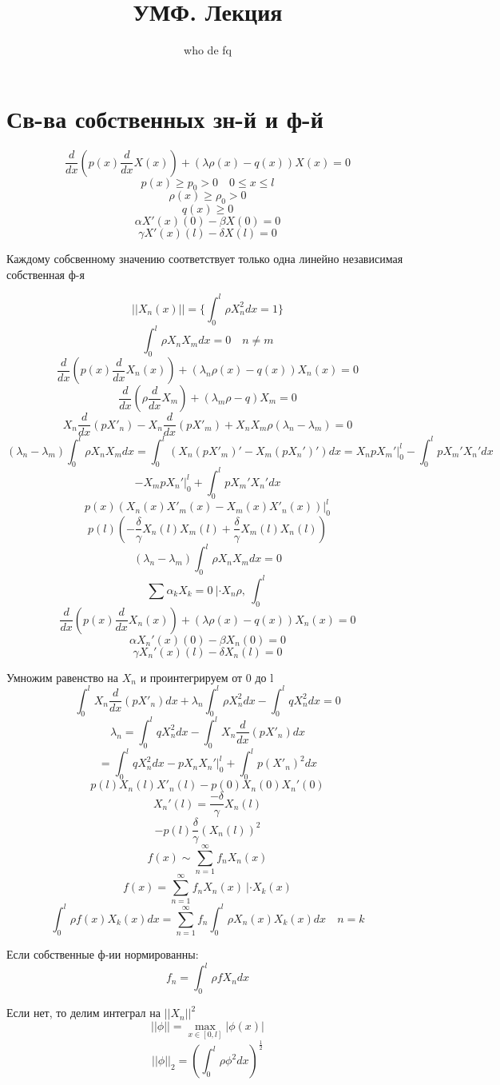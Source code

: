 \documentclass[a4paper]{article}
\begin{document}
\title{УМФ. Лекция}
\author{who de fq}
\maketitle

\section*{\centering Св-ва собственных зн-й и ф-й}
\[
    \frac{d}{dx} \left(p(x) \frac{d}{dx} X(x)\right) + (\lambda \rho(x) - q(x)) X(x) = 0
\]
\[
    p(x) \geq p_0 > 0 \quad 0 \leq x \leq l
\]
\[
    \rho(x) \geq \rho_0 > 0
\]
\[
    q(x) \geq 0
\]
\[
    \alpha X'(x)(0) - \beta X(0) = 0
\]
\[
    \gamma X'(x)(l) - \delta X(l) = 0
\]

Каждому собсвенному значению соответствует только одна линейно независимая
собственная ф-я

\[
    ||X_n(x)|| = \{ \int_{0}^{l} \rho X_n^2 dx = 1 \}
\]
\[
    \int_{0}^{l} \rho X_n X_m dx = 0 \quad n \neq m
\]
\[
    \frac{d}{dx} \left(p(x) \frac{d}{dx} X_n(x)\right) + (\lambda_n \rho(x) - q(x)) X_n(x) = 0
\]
\[
    \frac{d}{dx} \left(\rho \frac{d}{dx} X_m\right) + (\lambda_m \rho - q) X_m = 0
\]
\[
    X_n \frac{d}{dx} (pX'_n) - X_n \frac{d}{dx} (pX'_m) + X_n X_m \rho
    (\lambda_n - \lambda_m) = 0
\]
\[
    (\lambda_n - \lambda_m) \int_{0}^{l} \rho X_n X_m dx =
    \int_{0}^{l} \left( X_n(pX'_m)' - X_m(pX_n')' \right) dx
    = X_n p X_m' \big|_{0}^{l} - \int_{0}^{l} p X_m' X_n' dx 
\]
\[
    - X_m p X_n' |_{0}^{l} + \int_{0}^{l} p X_m' X_n' dx
\]
\[
    p(x) (X_n(x) X'_m(x) - X_m(x) X'_n(x)) \big|_{0}^{l}
\]
\[
    p(l) \left(-\frac{\delta}{\gamma} X_n(l) X_m(l) + \frac{\delta}{\gamma} 
    X_m(l) X_n(l) \right)
\]
\[
    (\lambda_n - \lambda_m) \int_{0}^{l} \rho X_n X_m dx = 0
\]
\[
    \sum \alpha_{k} X_k = 0 \ | \cdot X_n \rho, \ \int_{0}^{l}
\]
\[
    \frac{d}{dx} \left(p(x) \frac{d}{dx} X_n(x)\right) + (\lambda \rho(x) - q(x)) X_n(x) = 0
\]
\[
    \alpha X_n'(x)(0) - \beta X_n(0) = 0
\]
\[
    \gamma X_n'(x)(l) - \delta X_n(l) = 0
\]

Умножим равенство на $ X_n $ и проинтегрируем от 0 до l
\[
    \int_{0}^{l} X_n \frac{d}{dx} (pX'_n) dx + \lambda_n \int_{0}^{l} \rho
    X^2_n dx - \int_{0}^{l} q X^2_n dx = 0
\]
\[
    \lambda_n = \int_{0}^{l} q X_n^2 dx - \int_{0}^{l} X_n \frac{d}{dx} (pX'_n) dx
\]
\[
    = \int_{0}^{l} q X_n^2 dx - p X_n X_n' \big|_{0}^{l} + \int_{0}^{l} p
    (X'_n)^2 dx
\]
\[
    p(l) X_n(l) X'_n(l) - p(0) X_n(0)X_n'(0)
\]
\[
    X_n'(l) = \frac{-\delta}{\gamma} X_n(l)
\]
\[
    -p(l) \frac{\delta}{\gamma} (X_n(l))^2
\]
\[
    f(x) \sim \sum_{n=1}^{\infty} f_n X_n(x)
\]
\[
    f(x) = \sum_{n=1}^{\infty} f_n X_n(x) \ | \cdot X_k(x)
\]
\[
    \int_{0}^{l} \rho f(x) X_k(x) dx = \sum_{n=1}^{\infty} f_n \int_{0}^{l} 
    \rho X_n(x) X_k(x) dx \quad n = k
\]

Если собственные ф-ии нормированны:
\[
    f_n = \int_{0}^{l} \rho f X_n dx
\]

Если нет, то делим интеграл на $ ||X_n||^2 $ 
\[
    || \phi || = \max_{x \in [0, l]} | \phi(x) |
\]
\[
    || \phi ||_{2} = \left( \int_{0}^{l} \rho \phi^2 dx \right)^{\frac{1}{2}}
\]
\end{document}
